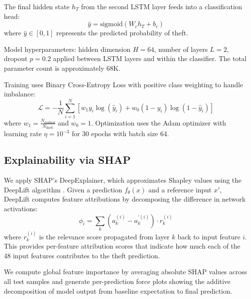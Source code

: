\documentclass[journal]{IEEEtran}
\begin{document}
The final hidden state $h_T$ from the second LSTM layer feeds into a classification head:
\begin{equation}
    \hat{y} = \text{sigmoid}(W_c h_T + b_c)
\end{equation}
where $\hat{y} \in [0, 1]$ represents the predicted probability of theft.

Model hyperparameters: hidden dimension $H = 64$, number of layers $L = 2$, dropout $p = 0.2$ applied between LSTM layers and within the classifier. The total parameter count is approximately 68K.

Training uses Binary Cross-Entropy Loss with positive class weighting to handle imbalance:
\begin{equation}
    \mathcal{L} = -\frac{1}{N}\sum_{i=1}^{N} \left[w_1 y_i \log(\hat{y}_i) + w_0 (1 - y_i) \log(1 - \hat{y}_i)\right]
\end{equation}
where $w_1 = \frac{N_{\text{normal}}}{N_{\text{theft}}}$ and $w_0 = 1$. Optimization uses the Adam optimizer with learning rate $\eta = 10^{-3}$ for 30 epochs with batch size 64.

\subsection{Explainability via SHAP}
We apply SHAP's DeepExplainer, which approximates Shapley values using the DeepLift algorithm \cite{lundberg2017}. Given a prediction $f_\theta(x)$ and a reference input $x'$, DeepLift computes feature attributions by decomposing the difference in network activations:
\begin{equation}
    \phi_i = \sum_{k} (a_k^{(i)} - a_k^{\prime(i)}) \cdot r_k^{(i)}
\end{equation}
where $r_k^{(i)}$ is the relevance score propagated from layer $k$ back to input feature $i$. This provides per-feature attribution scores that indicate how much each of the 48 input features contributes to the theft prediction.

We compute global feature importance by averaging absolute SHAP values across all test samples and generate per-prediction force plots showing the additive decomposition of model output from baseline expectation to final prediction.
\end{document}
